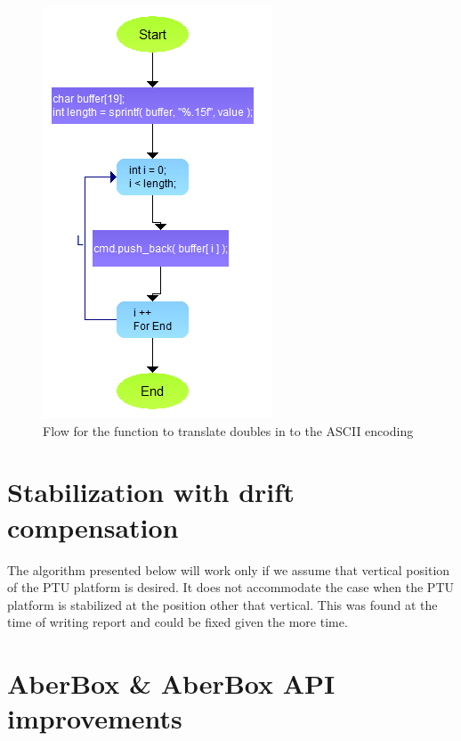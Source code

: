  \begin{figure}[H]
 \centering
 \centerline{\includegraphics[scale=0.65]{./images/pushDfunction}}
 \caption{Flow for the function to translate doubles in to the ASCII encoding}
 \label{fig:pushDfunction}
 \end{figure}
 
 
 \section{Stabilization with drift compensation}
 
 The algorithm presented below will work only if we assume that vertical position of the PTU platform is desired. It does not accommodate the case when the PTU  platform is stabilized at the position other that vertical. This was found at the time of writing report and could be fixed given the more time.
 
 \section{AberBox \& AberBox API improvements}

